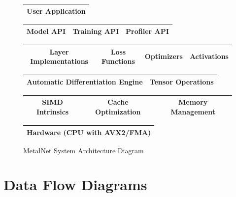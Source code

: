 \documentclass[12pt,oneside,a4paper]{report}
\begin{document}
\begin{figure}[H]
\centering
\begin{tabular}{|c|}
\hline
\textbf{User Application} \\
\hline
\end{tabular}

\vspace{0.5cm}

\begin{tabular}{|c|c|c|}
\hline
\textbf{Model API} & \textbf{Training API} & \textbf{Profiler API} \\
\hline
\end{tabular}

\vspace{0.5cm}

\begin{tabular}{|c|c|c|c|}
\hline
\textbf{Layer Implementations} & \textbf{Loss Functions} & \textbf{Optimizers} & \textbf{Activations} \\
\hline
\end{tabular}

\vspace{0.5cm}

\begin{tabular}{|c|c|}
\hline
\textbf{Automatic Differentiation Engine} & \textbf{Tensor Operations} \\
\hline
\end{tabular}

\vspace{0.5cm}

\begin{tabular}{|c|c|c|}
\hline
\textbf{SIMD Intrinsics} & \textbf{Cache Optimization} & \textbf{Memory Management} \\
\hline
\end{tabular}

\vspace{0.5cm}

\begin{tabular}{|c|}
\hline
\textbf{Hardware (CPU with AVX2/FMA)} \\
\hline
\end{tabular}

\caption{MetalNet System Architecture Diagram}
\end{figure}

\section{Data Flow Diagrams}
\end{document}

